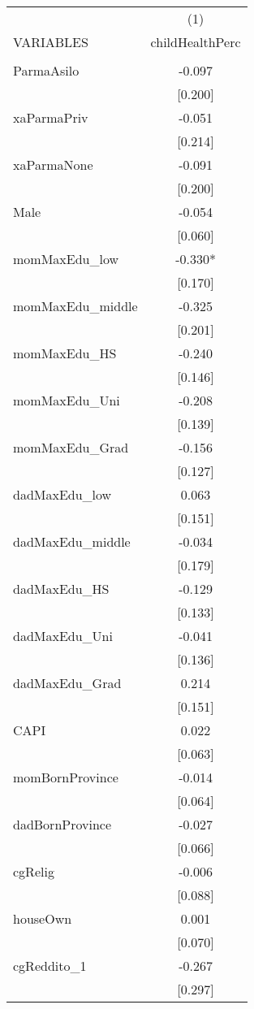 \documentclass[]{article}
\begin{document}
\begin{tabular}{lc} \hline
 & (1) \\
VARIABLES & childHealthPerc \\ \hline
 &  \\
ParmaAsilo & -0.097 \\
 & [0.200] \\
xaParmaPriv & -0.051 \\
 & [0.214] \\
xaParmaNone & -0.091 \\
 & [0.200] \\
Male & -0.054 \\
 & [0.060] \\
momMaxEdu\_low & -0.330* \\
 & [0.170] \\
momMaxEdu\_middle & -0.325 \\
 & [0.201] \\
momMaxEdu\_HS & -0.240 \\
 & [0.146] \\
momMaxEdu\_Uni & -0.208 \\
 & [0.139] \\
momMaxEdu\_Grad & -0.156 \\
 & [0.127] \\
dadMaxEdu\_low & 0.063 \\
 & [0.151] \\
dadMaxEdu\_middle & -0.034 \\
 & [0.179] \\
dadMaxEdu\_HS & -0.129 \\
 & [0.133] \\
dadMaxEdu\_Uni & -0.041 \\
 & [0.136] \\
dadMaxEdu\_Grad & 0.214 \\
 & [0.151] \\
CAPI & 0.022 \\
 & [0.063] \\
momBornProvince & -0.014 \\
 & [0.064] \\
dadBornProvince & -0.027 \\
 & [0.066] \\
cgRelig & -0.006 \\
 & [0.088] \\
houseOwn & 0.001 \\
 & [0.070] \\
cgReddito\_1 & -0.267 \\
 & [0.297] \\

\end{tabular}
\end{document}
